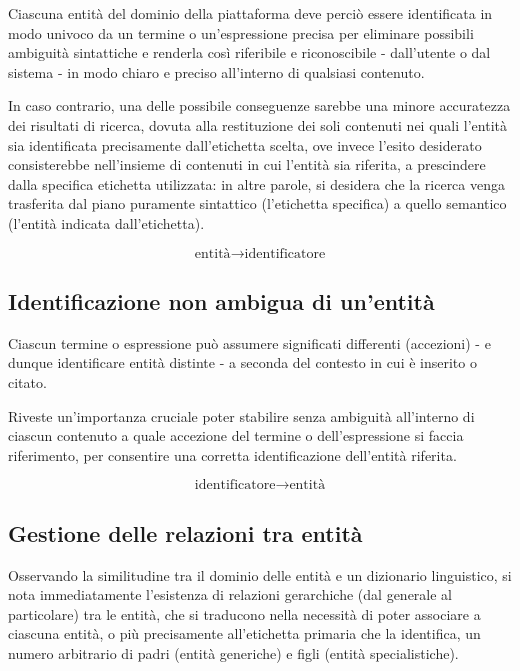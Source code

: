 \documentclass[10pt,a4paper,headinclude,footinclude,hidelinks]{scrreprt} %
\begin{document}
	Ciascuna entità del dominio della piattaforma deve perciò essere identificata in modo univoco da un termine o un'espressione precisa per eliminare possibili ambiguità sintattiche e renderla così riferibile e riconoscibile - dall'utente o dal sistema - in modo chiaro e preciso all'interno di qualsiasi contenuto.

	In caso contrario, una delle possibile conseguenze sarebbe una minore accuratezza dei risultati di ricerca, dovuta alla restituzione dei soli contenuti nei quali l'entità sia identificata precisamente dall'etichetta scelta, ove invece l'esito desiderato consisterebbe nell'insieme di contenuti in cui l'entità sia riferita, a prescindere dalla specifica etichetta utilizzata: in altre parole, si desidera che la ricerca venga trasferita dal piano puramente sintattico (l'etichetta specifica) a quello semantico (l'entità indicata dall'etichetta).

	$$ \textrm{entità} \rightarrow \textrm{identificatore} $$
	\subsection{Identificazione non ambigua di un'entit\`a}
	Ciascun termine o espressione può assumere significati differenti (accezioni) - e dunque identificare entità distinte - a seconda del contesto in cui è inserito o citato.

	Riveste un'importanza cruciale poter stabilire senza ambiguità all'interno di ciascun contenuto a quale accezione del termine o dell'espressione si faccia riferimento, per consentire una corretta identificazione dell'entità riferita.

	$$ \textrm{identificatore} \rightarrow \textrm{entità} $$

	\subsection{Gestione delle relazioni tra entit\`a}

	Osservando la similitudine tra il dominio delle entità e un dizionario linguistico, si nota immediatamente l'esistenza di relazioni gerarchiche (dal generale al particolare) tra le entità, che si traducono nella necessità di poter associare a ciascuna entità, o più precisamente all'etichetta primaria che la identifica, un numero arbitrario di padri (entità generiche) e figli (entità specialistiche).
\end{document}
